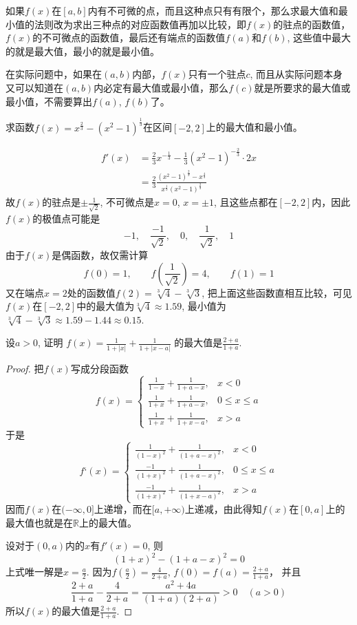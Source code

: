 如果$f(x)$在$[a,b]$内有不可微的点，而且这种点只有有限个，那么求最大值和最小值的法则改为求出三种点的对应函数值再加以比较，即$f(x)$的驻点的函数值，$f(x)$的不可微点的函数值，最后还有端点的函数值$f(a)$和$f(b)$, 这些值中最大的就是最大值，最小的就是最小值。

在实际问题中，如果在$(a,b)$内部，$f(x)$只有一个驻点$c$, 而且从实际问题本身又可以知道在$(a,b)$内必定有最大值或最小值，那么$f(c)$就是所要求的最大值或最小值，不需要算出$f(a)$, $f(b)$了。

\begin{example}
求函数$f(x)=x^{\tfrac{2}{3}}-(x^2-1)^{\tfrac{1}{3}}$在区间$[-2,2]$上的最大值和最小值。
\end{example}


\begin{solution}
\[\begin{split}
f'(x)&=\frac{2}{3}x^{-\tfrac{1}{3}}-\frac{1}{3}(x^2-1)^{-\tfrac{2}{3}}\cdot 2x\\
&=\frac{2}{3} \frac{(x^2-1)^{\tfrac{2}{3}}-x^{\tfrac{4}{3}}}{x^{\tfrac{1}{3}}(x^2-1)^{\tfrac{2}{3}}}    
\end{split}\]
    故$f(x)$的驻点是$\pm\frac{1}{\sqrt{2}}$, 不可微点是$x=0$, $x=\pm 1$, 且这些点都在$[-2, 2]$内，因此$f(x)$的极值点可能是
\[-1,\quad \frac{-1}{\sqrt{2}},\quad  0,\quad \frac{1}{\sqrt{2}},\quad  1\]
    由于$f(x)$是偶函数，故仅需计算
\[    f (0) =1,\qquad f\left(\frac{1}{\sqrt{2}}\right) =4,\qquad f (1) =1\]
    又在端点$x=2$处的函数值$f(2)=\sqrt[3]{4}-\sqrt[3]{3}$, 把上面这些函数直相互比较，可见$f(x)$在$[-2, 2]$中的最大值为$\sqrt[3]{4}\approx 1.59$, 最小值为$\sqrt[3]{4}-\sqrt[3]{3}\approx 1.59-1. 44\approx 0.15$.
\end{solution}

\begin{example}
    设$a>0$, 证明
$    f (x) =\frac{1}{1+|x|}+\frac{1}{1+|x-a|}$
    的最大值是$\frac{2+a}{1+a}$.
\end{example}    

\begin{proof}
把$f(x)$写成分段函数
\[f(x)=\begin{cases}
    \frac{1}{1-x}+\frac{1}{1+a-x}, & x<0\\
    \frac{1}{1+x}+\frac{1}{1+a-x}, & 0\le x\le a\\
    \frac{1}{1+x}+\frac{1}{1+x-a}, & x>a
\end{cases}\]
于是
\[f‘(x)=\begin{cases}
    \frac{1}{(1-x)^2}+\frac{1}{(1+a-x)^2}, & x<0\\
    \frac{-1}{(1+x)^2}+\frac{1}{(1+a-x)^2}, & 0\le x\le a\\
    \frac{-1}{(1+x)^2}+\frac{1}{(1+x-a)^2}, & x>a
\end{cases}\]
因而$f(x)$在$(-\infty, 0]$上递增，而在$[a,+\infty)$上递减，由此得知$f(x)$在$[0,a]$上的最大值也就是在$\mathbb{R}$上的最大值。

设对于$(0,a)$内的$x$有$f'(x)=0$, 则
\[(1+x)^2- (1+a-x)^2=0\]
上式唯一解是$x=\frac{a}{2}$. 
因为$f\left(\frac{a}{2}\right)=\frac{4}{2+a}$, $f(0)=f(a)=\frac{2+a}{1+a}$，
并且
\[\frac{2+a}{1+a}-\frac{4}{2+a}= \frac{a^2+4a}{(1+a) (2+a)}>0\quad  (a>0)\]
所以$f(x)$的最大值是$\frac{2+a}{1+a}$.
\end{proof}

